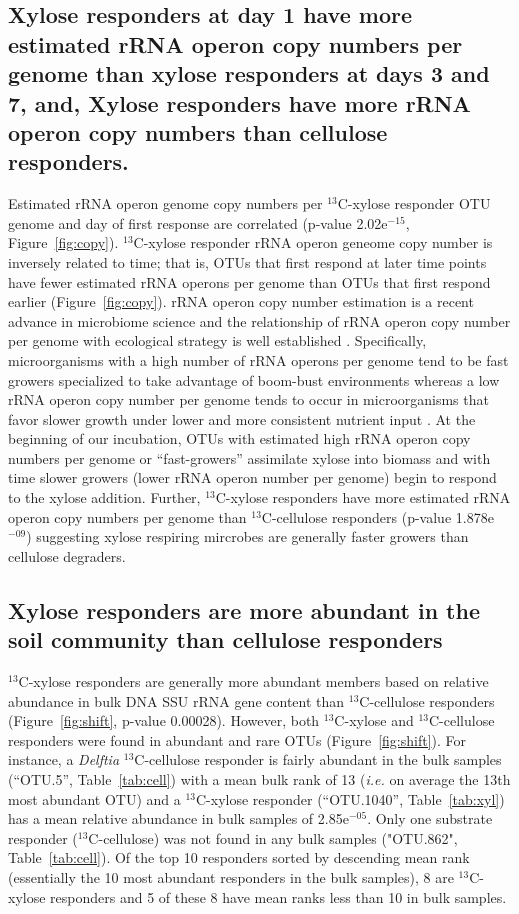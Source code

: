 \subsection{Xylose responders at day 1 have more estimated rRNA operon copy numbers per genome
than xylose responders at days 3 and 7, and, Xylose responders have more rRNA operon copy numbers
than cellulose responders.}
Estimated rRNA operon genome copy numbers per $^{13}$C-xylose responder OTU
genome and day of first response are correlated (p-value 2.02e$^{-15}$,
Figure~\ref{fig:copy}). $^{13}$C-xylose responder rRNA operon geneome copy
number is inversely related to time; that is, OTUs that first respond at later
time points have fewer estimated rRNA operons per genome than OTUs that first
respond earlier (Figure~\ref{fig:copy}). rRNA operon copy number estimation is
a recent advance in microbiome science \citep{Kembel_2012} and the relationship
of rRNA operon copy number per genome with ecological strategy is well
established \citep{Klappenbach_2000}. Specifically, microorganisms with a high
number of rRNA operons per genome tend to be fast growers specialized to take
advantage of boom-bust environments whereas a low rRNA operon copy number per
genome tends to occur in microorganisms that favor slower growth under lower
and more consistent nutrient input \citep{Klappenbach_2000}. At the beginning
of our incubation, OTUs with estimated high rRNA operon copy numbers per genome
or ``fast-growers'' assimilate xylose into biomass and with time slower growers
(lower rRNA operon number per genome) begin to respond to the xylose addition.
Further, $^{13}$C-xylose responders have more estimated rRNA operon copy
numbers per genome than $^{13}$C-cellulose responders (p-value 1.878e$^{-09}$)
suggesting xylose respiring mircrobes are generally faster growers than
cellulose degraders.

\subsection{Xylose responders are more abundant in the soil community than cellulose
responders}
$^{13}$C-xylose responders are generally more abundant members based on
relative abundance in bulk DNA SSU rRNA gene content than $^{13}$C-cellulose
responders (Figure~\ref{fig:shift}, p-value 0.00028).  However, both $^{13}$C-xylose
and $^{13}$C-cellulose responders were found in abundant and rare OTUs
(Figure~\ref{fig:shift}). For instance, a \textit{Delftia} $^{13}$C-cellulose
responder is fairly abundant in the bulk samples (``OTU.5'',
Table~\ref{tab:cell}) with a mean bulk rank of 13 (\textit{i.e.} on average the
13th most abundant OTU) and a $^{13}$C-xylose responder (``OTU.1040'',
Table~\ref{tab:xyl}) has a mean relative abundance in bulk samples
of 2.85e$^{-05}$. Only one substrate responder ($^{13}$C-cellulose) was not
found in any bulk samples ("OTU.862", Table~\ref{tab:cell}). Of the top 10
responders sorted by descending mean rank (essentially the 10 most abundant
responders in the bulk samples), 8 are $^{13}$C-xylose responders and 5 of
these 8 have mean ranks less than 10 in bulk samples.
